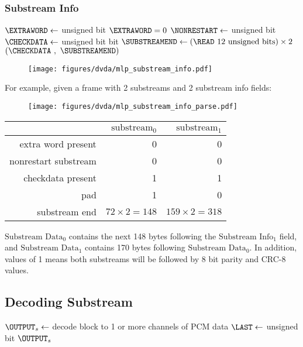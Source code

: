 \subsubsection{Substream Info}
{
$\text{\EXTRAWORD} \leftarrow$  unsigned bit\;
\ASSERT $\text{\EXTRAWORD} = 0$\;
$\text{\NONRESTART} \leftarrow$  unsigned bit\;
$\text{\CHECKDATA} \leftarrow$  unsigned bit\;
 bit\;
$\text{\SUBSTREAMEND} \leftarrow (\text{\READ 12 unsigned bits}) \times 2$\;
\Return $(\text{\CHECKDATA}~,~\text{\SUBSTREAMEND})$\;
\EALGORITHM
}
\begin{figure}[h]
  \texttt{[image: figures/dvda/mlp\_substream\_info.pdf]}
\end{figure}
\par
\noindent
For example, given a frame with 2 substreams
and 2 substream info fields:
\begin{figure}[h]
  \texttt{[image: figures/dvda/mlp\_substream\_info\_parse.pdf]}
\end{figure}
\begin{table}[h]
\begin{tabular}{rrr}
& $\text{substream}_0$ & $\text{substream}_1$ \\
\hline
extra word present & 0 & 0 \\
nonrestart substream & 0 & 0 \\
checkdata present & 1 & 1 \\
pad & 1 & 0 \\
substream end & $72 \times 2 = 148$ & $159 \times 2 = 318$ \\
\end{tabular}
\end{table}
\par
\noindent
$\text{Substream Data}_0$ contains
the next 148 bytes following the $\text{Substream Info}_1$ field,
and $\text{Substream Data}_1$ contains 170 bytes
following $\text{Substream Data}_0$.
In addition,  values of 1
means both substreams will be followed by 8 bit parity and CRC-8 values.

\clearpage

\subsection{Decoding Substream}
{
$\text{\OUTPUT}_s \leftarrow$ decode block to 1 or more channels of PCM data\;
$\text{\LAST} \leftarrow$  unsigned bit\;
\BlankLine
\Return $\text{\OUTPUT}_s$\;
\EALGORITHM
}

